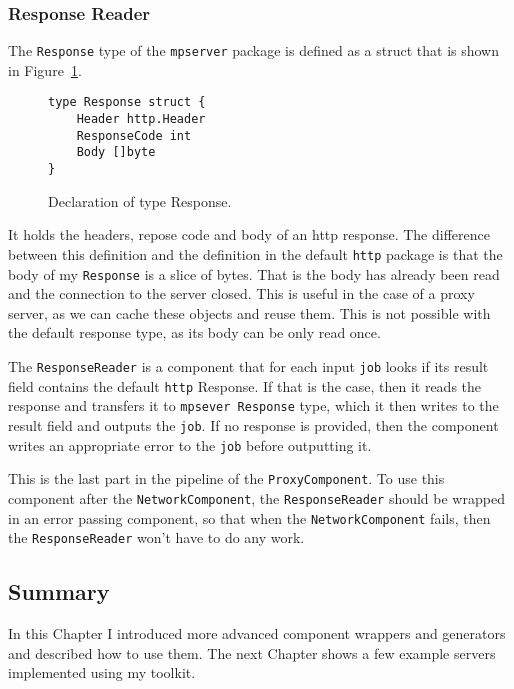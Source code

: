 \newpage
\subsubsection{Response Reader}
The \texttt{Response} type of the \texttt{mpserver} package is defined as
a struct that is shown in Figure~\ref{fig:Response}.
\begin{figure}[h]
\centering
\begin{lstlisting}
type Response struct {
    Header http.Header
    ResponseCode int
    Body []byte
}
\end{lstlisting}
\caption[scale=1.0]{Declaration of type Response.}
\label{fig:Response}
\end{figure}

It holds the headers, repose code and body of an http response. 
The difference between
this definition and the definition in the default \texttt{http} package is that
the body of my \texttt{Response} is a slice of bytes. 
That is the body has already been
read and the connection to the server closed. This is useful
in the case of a proxy server, as we can cache these objects and reuse
them. This is not possible with the default response type,
as its body can be only read once.

The \texttt{ResponseReader} is a component that for each input \texttt{job}
looks if its result field contains the default \texttt{http} Response. 
If that is the case,
then it reads the response and transfers it to \texttt{mpsever Response} 
type, which it
then writes to the result field and outputs the \texttt{job}. If no response
is provided, then the component writes an appropriate error to the
\texttt{job} before outputting it.

This is the last part in the pipeline of the \texttt{ProxyComponent}.
To use this component after the \texttt{NetworkComponent}, 
the \texttt{ResponseReader} should be wrapped in an error passing 
component, so that when the \texttt{Network\-Component} fails, then 
the \texttt{ResponseReader} won't have to do any work.


\subsection{Summary}
In this Chapter I introduced more advanced component wrappers and generators
and described how to use them. The next Chapter shows a few example
servers implemented using my toolkit.

